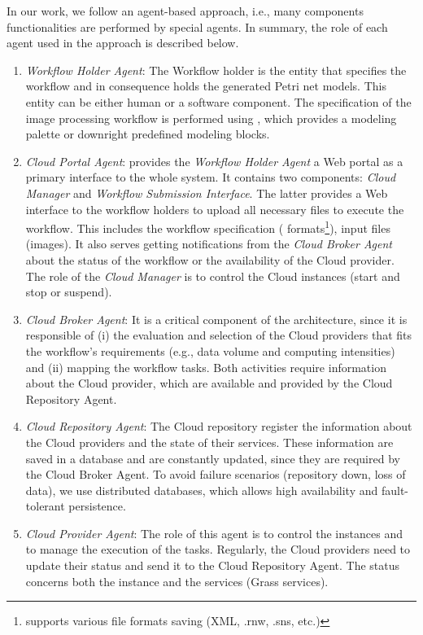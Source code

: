 In our work, we follow an agent-based approach, i.e., many components functionalities are performed by special agents.
%
In summary, the role of each agent used in the approach is described below.
%
\begin{enumerate}
 \item 
 \textit{Workflow Holder Agent}:
 The Workflow holder is the entity that specifies the workflow and in consequence holds the generated Petri net models.
 This entity can be either human or a software component.
 The specification of the image processing workflow is performed using \RenewGrass{}, which provides a modeling palette or downright predefined modeling blocks.
\item 
 \textit{Cloud Portal Agent}:
 provides the \textit{Workflow Holder Agent} a Web portal as a primary interface to the whole system.
 It contains two components: \textit{Cloud Manager} and \textit{Workflow Submission Interface}.
 The latter provides a Web interface to the workflow holders to upload all necessary files to execute the workflow.
 This includes the workflow specification (\Renew{} formats\footnote{\Renew{} supports various file formats saving (XML, .rnw, .sns, etc.)}), input files (images).
 It also serves getting notifications from the \textit{Cloud Broker Agent} about the status of the workflow or the availability of the Cloud provider.
%
The role of the \textit{Cloud Manager} is to control the Cloud instances (start and stop or suspend).

% 
%
% 
 \item 
 \textit{Cloud Broker Agent}:
 It is a critical component of the architecture, since it is responsible of (i) the evaluation and selection of the Cloud providers that fits the workflow's requirements (e.g., data volume and computing intensities) and (ii) mapping the workflow tasks.%
 Both activities require information about the Cloud provider, which are available and provided by the Cloud Repository Agent.
 \item 
 \textit{Cloud Repository Agent}:
 The Cloud repository register the information about the Cloud providers and the state of their services.
 These information are saved in a database and are constantly updated, since they are required by the Cloud Broker Agent.
 To avoid failure scenarios (repository down, loss of data), we use distributed databases, which allows high availability and fault-tolerant persistence.
\item 
 \textit{Cloud Provider Agent}:
The role of this agent is to control the instances and to manage the execution of the tasks.
%
Regularly, the Cloud providers need to update their status and send it to the Cloud Repository Agent.
%
The status concerns both the instance and the services (Grass services).
\end{enumerate}


